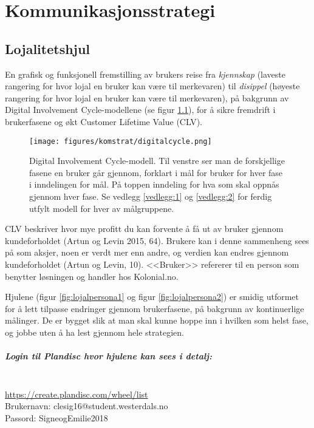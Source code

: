 \chapter{Kommunikasjonsstrategi}
\section{\textbf{Lojalitetshjul}} 
En grafisk og funksjonell fremstilling av brukers reise fra \textit{kjennskap} (laveste rangering for hvor lojal en bruker kan være til merkevaren) til \textit{disippel} (høyeste rangering for hvor lojal en bruker kan være til merkevaren), på bakgrunn av Digital Involvement Cycle-modellene (se figur \ref{fig:digitalcycle}), for å sikre fremdrift i brukerfasene og økt Customer Lifetime Value (CLV). 

\begin{figure}[H] 
    \centering
    \texttt{[image: figures/komstrat/digitalcycle.png]}
    \caption[Digital Involvement Cycle-modell]{Digital Involvement Cycle-modell. Til venstre ser man de forskjellige fasene en bruker går gjennom, forklart i mål for bruker for hver fase i inndelingen for mål. På toppen inndeling for hva som skal oppnås gjennom hver fase. Se vedlegg \ref{vedlegg:1} og \ref{vedlegg:2} for ferdig utfylt modell for hver av målgruppene.
    \label{fig:digitalcycle}}
\end{figure}

CLV beskriver hvor mye profitt du kan forvente å få ut av bruker gjennom kundeforholdet (Artun og Levin 2015, 64). Brukere kan i denne sammenheng sees på som aksjer, noen er verdt mer enn andre, og verdien kan endres gjennom kundeforholdet (Artun og Levin, 10). <<Bruker>> refererer til en person som benytter løsningen og handler hos Kolonial.no.

Hjulene (figur \ref{fig:lojalpersona1} og figur \ref{fig:lojalpersona2}) er smidig utformet for å lett tilpasse endringer gjennom brukerfasene, på bakgrunn av kontinuerlige målinger. De er bygget slik at man skal kunne hoppe inn i hvilken som helst fase, og jobbe uten å ha lest gjennom hele strategien.

\paragraph{\textbf{Login til Plandisc hvor hjulene kan sees i detalj:}} \\\url{https://create.plandisc.com/wheel/list}
\\Brukernavn: clesig16@student.westerdals.no 
\\Passord: SigneogEmilie2018

